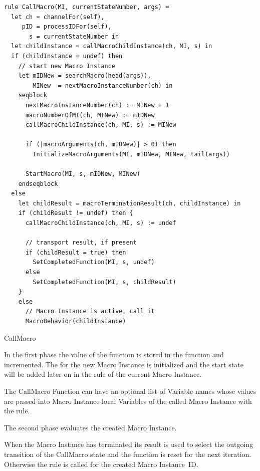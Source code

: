 \begin{listing}[htbp]
\begin{verbatim}
rule CallMacro(MI, currentStateNumber, args) =
  let ch = channelFor(self),
     pID = processIDFor(self),
       s = currentStateNumber in
  let childInstance = callMacroChildInstance(ch, MI, s) in
  if (childInstance = undef) then
    // start new Macro Instance
    let mIDNew = searchMacro(head(args)),
        MINew  = nextMacroInstanceNumber(ch) in
    seqblock
      nextMacroInstanceNumber(ch) := MINew + 1
      macroNumberOfMI(ch, MINew) := mIDNew
      callMacroChildInstance(ch, MI, s) := MINew

      if (|macroArguments(ch, mIDNew)| > 0) then
        InitializeMacroArguments(MI, mIDNew, MINew, tail(args))

      StartMacro(MI, s, mIDNew, MINew)
    endseqblock
  else
    let childResult = macroTerminationResult(ch, childInstance) in
    if (childResult != undef) then {
      callMacroChildInstance(ch, MI, s) := undef

      // transport result, if present
      if (childResult = true) then
        SetCompletedFunction(MI, s, undef)
      else
        SetCompletedFunction(MI, s, childResult)
    }
    else
      // Macro Instance is active, call it
      MacroBehavior(childInstance)
\end{verbatim}
\caption{CallMacro}
\label{lst:shortasm:CallMacro}
\end{listing}


In the first phase the value of the 
function is stored in the  function and
incremented. The  for the new Macro Instance is
initialized and the start state will be added later on in the
 rule of the current Macro Instance.

The CallMacro Function can have an optional list of Variable names whose values
are passed into Macro Instance-local Variables of the called Macro Instance with
the  rule.

The second phase evaluates the created Macro Instance.

When the Macro Instance has terminated its result is used to select the
outgoing transition of the CallMacro state and the 
function is reset for the next iteration. Otherwise the
 rule is called for the created Macro Instance~ID.



